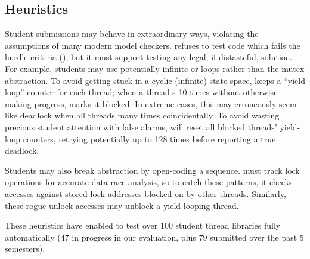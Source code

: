 \subsection{Heuristics}

Student submissions may behave in extraordinary ways, violating the assumptions of many modern model checkers.
\landslide refuses to test code which fails the hurdle criteria (\sect{\ref{sec:grading}}),
but it must support testing any legal, if distasteful, solution.
For example, students may use potentially infinite  or  loops rather than the mutex abstraction. %
To avoid getting stuck in a cyclic (infinite) state space, \landslide keeps a ``yield loop'' counter for each thread;
when a thread s 10 times without otherwise making progress, \landslide marks it blocked.
%
In extreme cases, this may erroneously seem like deadlock when all threads  many times coincidentally.
To avoid wasting precious student attention with false alarms, %
\landslide will reset all blocked threads' yield-loop counters,
retrying potentially up to 128 times before reporting a true deadlock.

Students may also break abstraction by open-coding a  sequence.
\landslide must track lock operations for accurate data-race analysis,
so to catch these patterns, it
checks accesses against stored lock addresses blocked on by other threads.
Similarly, these rogue unlock accesses may unblock a yield-looping thread.

These heuristics have enabled \landslide to test over 100 student thread libraries
fully automatically
(47 in progress in our evaluation, plus
79 submitted over the past 5 semesters).
